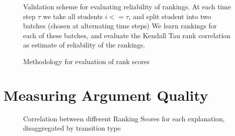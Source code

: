 \documentclass[notitlepage,12pt]{jedm}
\begin{document}
\begin{figure}
	\centering
	\def\svgscale{0.5}
	
	\caption{
		Validation scheme for evaluating reliability of rankings.
		At each time step $\tau$ we take all students $i<=\tau$, and split 
		student into two batches (chosen at alternating time steps)
		We learn rankings for each of these batches, and evaluate the Kendall 
		Tau rank correlation as estimate of reliability of the rankings.
	}
	\label{fig:rank_reliability}
\end{figure}

\begin{figure}
	\caption{Methodology for evaluation of rank scores}
	\label{fig:evaluate_rankings}
\end{figure}

\section{Measuring Argument Quality}\label{sec:measure}
\begin{figure}
	\scalebox{0.6}{}
	\caption{
		Correlation between different Ranking Scores for each explanation, 
		disaggregated by transition type  
	}
	\label{fig:acc_by_rank_score_type}
\end{figure}
\end{document}
